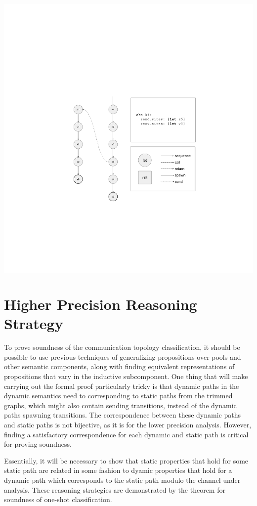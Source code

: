 \documentclass{article}
\begin{document}
\includegraphics[width=1.3\textwidth, left]{cml_graph_k4.pdf}

\section{Higher Precision Reasoning Strategy}
To prove soundness of the communication topology classification, it should be possible to use
previous techniques of generalizing propositions over pools and other semantic components,
along with finding equivalent representations of propositions that vary in the inductive
subcomponent. One thing that will make carrying out the formal proof particularly tricky is
that dynamic paths in the dynamic semantics need to corresponding to static paths from
the trimmed graphs, which might also contain sending transitions,
instead of the dynamic paths spawning transitions.
The correspondence between these dynamic paths and static paths
is not bijective, as it is for the lower precision analysis. However, finding a satisfactory
correspondence for each dynamic and static path is critical for proving soundness.

Essentially, it will be necessary to show that static
properties that hold for some static path are related in some fashion to dyamic properties
that hold for a dynamic path which corresponds to the static path modulo the channel under
analysis. These reasoning strategies are demonstrated by the theorem for soundness of
one-shot classification.
\end{document}
